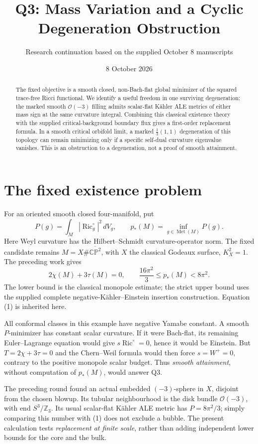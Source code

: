 \documentclass[11pt]{article}
\title{Q3: Mass Variation and a Cyclic Degeneration Obstruction}
\author{Research continuation based on the supplied October 8 manuscripts}
\date{8 October 2026}
\newcommand{\Ric}{\operatorname{Ric}}
\newcommand{\CP}{\mathbb{CP}}
\begin{document}
\maketitle
\begin{abstract}
The fixed objective is a smooth closed, non-Bach-flat global minimizer of
the squared trace-free Ricci functional. We identify a useful freedom in
one surviving degeneration: the marked smooth $\mathcal O(-3)$ filling
admits scalar-flat K\"ahler ALE metrics of either mass sign at the same
curvature integral. Combining this classical existence theory with the
supplied critical-background boundary flux gives a first-order replacement
formula. In a smooth critical orbifold limit, a marked
$\frac13(1,1)$ degeneration of this topology can remain minimizing only
if a specific self-dual curvature eigenvalue vanishes. This is an
obstruction to a degeneration, not a proof of smooth attainment.
\end{abstract}

\section{The fixed existence problem}
For an oriented smooth closed four-manifold, put
\[
 P(g)=\int_M|\Ric_g^\circ|^2\,dV_g,
 \qquad p_*(M)=\inf_{g\in\operatorname{Met}(M)}P(g).
\]
Here Weyl curvature has the Hilbert--Schmidt curvature-operator norm.
The fixed candidate remains $M=X\#\overline{\CP^{2}}$, with $X$ the
classical Godeaux surface, $K_X^2=1$. The preceding work gives
\[
 2\chi(M)+3\tau(M)=0,\qquad
 \frac{16\pi^2}{3}\le p_*(M)<8\pi^2.
 \tag{1}
\]
The lower bound is the classical monopole estimate; the strict upper
bound uses the supplied complete negative-K\"ahler--Einstein insertion
construction. Equation (1) is inherited here.

All conformal classes in this example have negative Yamabe constant.
A smooth $P$-minimizer has constant scalar curvature. If it were
Bach-flat, its remaining Euler--Lagrange equation would give
$s\Ric^\circ=0$, hence it would be Einstein. But $T=2\chi+3\tau=0$
and the Chern--Weil formula would then force $s=W^+=0$, contrary to
the positive monopole scalar budget. Thus \emph{smooth attainment},
without computation of $p_*(M)$, would answer Q3.

The preceding round found an actual embedded $(-3)$-sphere in $X$,
disjoint from the chosen blowup. Its tubular neighbourhood is the
disk bundle $\mathcal O(-3)$, with end $S^3/\mathbb Z_3$. Its usual
scalar-flat K\"ahler ALE metric has $P=8\pi^2/3$; simply comparing this
number with (1) does not exclude a bubble. The present calculation tests
\emph{replacement at finite scale}, rather than adding independent
lower bounds for the core and the bulk.
\end{document}
